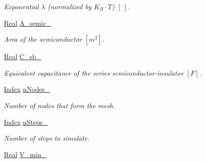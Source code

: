 \begin{DoxyCompactItemize}
\begin{DoxyCompactList}\small\item\em Exponential $ \lambda $ (normalized by $ K_B \cdot T $) $ \left[ ~ \right] $. \end{DoxyCompactList}\item 
\hypertarget{classParamList_abc3018d638813c07c11ade425d66d058}{\hyperlink{typedefs_8h_a060b837c3b4486ee35317744156f3da2}{Real} \hyperlink{classParamList_abc3018d638813c07c11ade425d66d058}{A\-\_\-semic\-\_\-}}\label{classParamList_abc3018d638813c07c11ade425d66d058}

\begin{DoxyCompactList}\small\item\em Area of the semiconductor $ \left[ m^2 \right] $. \end{DoxyCompactList}\item 
\hypertarget{classParamList_aa50ed4e92fd26b433e17e264fa82af71}{\hyperlink{typedefs_8h_a060b837c3b4486ee35317744156f3da2}{Real} \hyperlink{classParamList_aa50ed4e92fd26b433e17e264fa82af71}{C\-\_\-sb\-\_\-}}\label{classParamList_aa50ed4e92fd26b433e17e264fa82af71}

\begin{DoxyCompactList}\small\item\em Equivalent capacitance of the series semiconductor-\/insulator $ \left[ F \right] $. \end{DoxyCompactList}\item 
\hypertarget{classParamList_a574676917a0d7d70140f4ed29bb1e8b4}{\hyperlink{typedefs_8h_a2c726f8f32697958e9d6c2afecda531d}{Index} \hyperlink{classParamList_a574676917a0d7d70140f4ed29bb1e8b4}{n\-Nodes\-\_\-}}\label{classParamList_a574676917a0d7d70140f4ed29bb1e8b4}

\begin{DoxyCompactList}\small\item\em Number of nodes that form the mesh. \end{DoxyCompactList}\item 
\hypertarget{classParamList_a78ebf0df2418a1d19ac405bc86edee1e}{\hyperlink{typedefs_8h_a2c726f8f32697958e9d6c2afecda531d}{Index} \hyperlink{classParamList_a78ebf0df2418a1d19ac405bc86edee1e}{n\-Steps\-\_\-}}\label{classParamList_a78ebf0df2418a1d19ac405bc86edee1e}

\begin{DoxyCompactList}\small\item\em Number of steps to simulate. \end{DoxyCompactList}\item 
\hypertarget{classParamList_a6212d80113c5445355b66fef1e6928eb}{\hyperlink{typedefs_8h_a060b837c3b4486ee35317744156f3da2}{Real} \hyperlink{classParamList_a6212d80113c5445355b66fef1e6928eb}{V\-\_\-min\-\_\-}}\label{classParamList_a6212d80113c5445355b66fef1e6928eb}


\end{DoxyCompactItemize}
